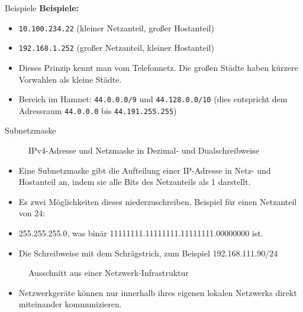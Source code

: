 \begin{frame}{Beispiele}
    \textbf{Beispiele:}

    \begin{itemize}
        \item \texttt{10.100.234.22} (kleiner Netzanteil, großer Hostanteil)
        \item \texttt{192.168.1.252} (großer Netzanteil, kleiner Hostanteil)
        \item Dieses Prinzip kennt man vom Telefonnetz. Die großen Städte haben kürzere Vorwahlen als kleine Städte.
        \item Bereich im Hamnet: \texttt{44.0.0.0/9} und \texttt{44.128.0.0/10} (dies entspricht dem Adressraum \texttt{44.0.0.0} bis \texttt{44.191.255.255})
    \end{itemize}



\end{frame}

\begin{frame}{Subnetzmaske}
    \begin{figure}
        \caption{\scriptsize IPv4-Adresse und Netzmaske in Dezimal- und Dualschreibweise}
        \label{netzmaske}
    \end{figure}

    \begin{itemize}
        \item Eine Subnetzmaske gibt die Aufteilung einer IP-Adresse in Netz- und Hostanteil an, indem sie alle Bits des Netzanteils als 1 darstellt.
    \end{itemize}
\end{frame}

\begin{frame}\begin{itemize}
        \item Es zwei Möglichkeiten dieses niederzuschreiben, Beispiel für einen Netzanteil von 24:
        \item 255.255.255.0, was binär 11111111.11111111.11111111.00000000 ist.
        \item Die Schreibweise mit dem Schrägstrich, zum Beispiel 192.168.111.90/24
    \end{itemize}

\end{frame}

\begin{frame}
    \begin{figure}
        \caption{\scriptsize Ausschnitt aus einer Netzwerk-Infrastruktur}
        \label{netzwerk}
    \end{figure}

    \begin{itemize}
        \item Netzwerkgeräte können nur innerhalb ihres eigenen lokalen Netzwerks direkt miteinander kommunizieren.
    \end{itemize}
\end{frame}

